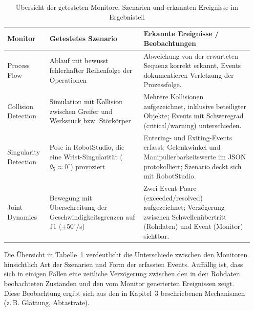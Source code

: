\begin{table}[H]
  \centering
  \small
  \begin{tabularx}{\textwidth}{lXX}
    \toprule
    \textbf{Monitor}      & \textbf{Getestetes Szenario}
    & \textbf{Erkannte Ereignisse / Beobachtungen}
    \\
    \midrule
    Process Flow          & Ablauf mit bewusst fehlerhafter
    Reihenfolge der Operationen                                &
    Abweichung von der erwarteten Sequenz korrekt erkannt, Events
    dokumentieren Verletzung der Prozessfolge.
    \\
    \addlinespace
    Collision Detection   & Simulation mit Kollision zwischen Greifer
    und Werkstück bzw. Störkörper                    & Mehrere
    Kollisionen aufgezeichnet, inklusive beteiligter Objekte; Events
    mit Schweregrad (critical/warning) unterschieden.                 \\
    \addlinespace
    Singularity Detection & Pose in RobotStudio, die eine
    Wrist-Singularität ($\theta_{5} \approx 0^\circ$) provoziert &
    Entering- und Exiting-Events erfasst; Gelenkwinkel und
    Manipulierbarkeitswerte im JSON protokolliert; Szenario deckt
    sich mit RobotStudio. \\
    \addlinespace
    Joint Dynamics        & Bewegung mit Überschreitung der
    Geschwindigkeitsgrenzen auf J1 ($\pm 50^\circ$/s)          & Zwei
    Event-Paare (exceeded/resolved) aufgezeichnet; Verzögerung
    zwischen Schwellenübertritt (Rohdaten) und Event (Monitor)
    sichtbar.       \\
    \bottomrule
  \end{tabularx}
  \caption{Übersicht der getesteten Monitore, Szenarien und erkannten
  Ereignisse im Ergebnisteil}
  \label{tab:monitor_overview}
\end{table}

Die Übersicht in Tabelle~\ref{tab:monitor_overview} verdeutlicht die
Unterschiede
zwischen den Monitoren hinsichtlich Art der Szenarien und Form der
erfassten Events.
Auffällig ist, dass sich in einigen Fällen eine zeitliche Verzögerung zwischen
den in den Rohdaten beobachteten Zuständen und den vom Monitor generierten
Ereignissen zeigt. Diese Beobachtung ergibt sich aus den in Kapitel~3
beschriebenen
Mechanismen (z.\,B. Glättung, Abtastrate).
